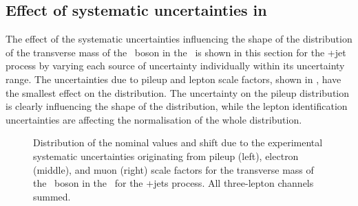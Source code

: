 \subsection{Effect of systematic uncertainties in \WZCR}
\label{sec:MTW}
The effect of the systematic uncertainties influencing the shape of the distribution of the transverse mass of the \PW\ boson in the \WZCR\ is shown in this section for the \WZ+jet process by varying each source of uncertainty individually within its uncertainty range.  The uncertainties due to pileup and lepton scale factors, shown in , have the smallest effect on the distribution. The uncertainty on the pileup distribution is clearly influencing the shape of the distribution, while the lepton identification uncertainties are affecting the normalisation of the whole distribution. 
\begin{figure}[htbp] 
	\centering 
	\caption{Distribution of the nominal values and shift due to the experimental systematic uncertainties originating from pileup (left), electron (middle), and muon (right) scale factors for the transverse mass of the \PW\ boson in the \WZCR\ for the \WZ+jets process. All three-lepton channels summed.}
\label{fig:shiftMTW1}
\end{figure}

